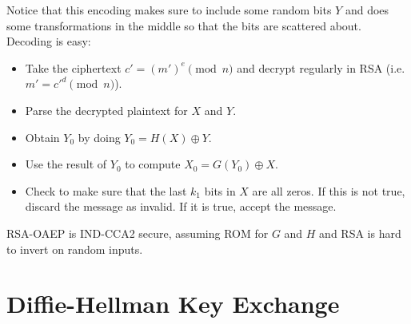 \documentclass[psamsfonts]{amsart}
\begin{document}
Notice that this encoding makes sure to include some random bits $Y$ and does some transformations in the middle so that the bits are scattered about. Decoding is easy:
\begin{itemize}
  \item Take the ciphertext $c' = (m')^e \pmod{n}$ and decrypt regularly in RSA (i.e. $m' = c'^d \pmod{n}$).
  \item Parse the decrypted plaintext for $X$ and $Y$.
  \item Obtain $Y_0$ by doing $Y_0 = H(X) \oplus Y$.
  \item Use the result of $Y_0$ to compute $X_0 = G(Y_0) \oplus X$.
  \item Check to make sure that the last $k_1$ bits in $X$ are all zeros. If this is not true, discard the message as invalid. If it is true, accept the message.
\end{itemize}

RSA-OAEP is IND-CCA2 secure, assuming ROM for $G$ and $H$ and RSA is hard to invert on random inputs.

\section{Diffie-Hellman Key Exchange}
\end{document}

